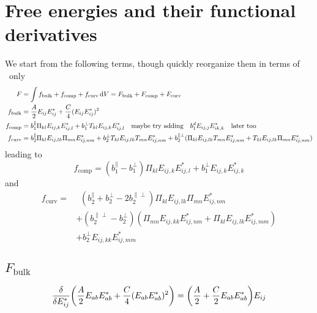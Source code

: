 \documentclass[11pt]{article}
\begin{document}
\newpage
\section{Free energies and their functional derivatives}\label{sec:freeenergies}
We start from the following terms, though quickly reorganize them in terms of \PP\ only
\begin{align}
    F &= \int f_\text{bulk} + f_\text{comp} + f_\text{curv} \dd{V} = F_\text{bulk} + F_\text{comp} + F_\text{curv}\\
    f_\text{bulk} &= \frac{A}{2} E_{ij}E_{ij}^* + \frac{C}{4} (E_{ij}E_{ij}^*)^2 \\
    f_\text{comp} &= b_1^\parallel \Pi_{kl} E_{ij,k}E_{ij,l}^* + b_1^\perp T_{kl} E_{ij,k}E_{ij,l}^* \qq{maybe try adding} b_1^d E_{ij,j}E_{ik,k}^* \qq{later too} \label{eq:fcompdef} \\
    f_\text{curv} &= b_2^\parallel \Pi_{kl}E_{ij,lk}\Pi_{mn}E_{ij,nm}^* + b_2^\perp T_{kl}E_{ij,lk}T_{mn}E_{ij,nm}^* + b_2^{\parallel\perp}(\Pi_{kl}E_{ij,lk}T_{mn}E_{ij,nm}^* + T_{kl}E_{ij,lk}\Pi_{mn}E_{ij,nm}^*)
\end{align}
leading to
\begin{equation}
    f_\text{comp} = (b_1^\parallel - b_1^\perp) \Pi_{kl} E_{ij,k}E_{ij,l}^* + b_1^\perp E_{ij,k}E_{ij,k}^*
\end{equation}
and
\begin{align}
    f_\text{curv} =&\enspace (b_2^\parallel + b_2^\perp - 2b_2^{\parallel\perp}) \Pi_{kl}E_{ij,lk}\Pi_{mn}E_{ij,nm}^* \\
    &+ (b_2^{\parallel\perp} - b_2^\perp)(\Pi_{mn}E_{ij,kk}E_{ij,nm}^* + \Pi_{kl}E_{ij,lk}E_{ij,mm}^*) \nonumber \\ 
    &+ b_2^\perp E_{ij,kk}E_{ij,mm}^* \nonumber
\end{align}

\subsection{$F_\text{bulk}$}
\begin{equation}
    \fdv{E_{ij}^*} \qty(\frac{A}{2} E_{ab}E_{ab}^* + \frac{C}{4} (E_{ab}E_{ab}^*)^2) = \qty(\frac{A}{2} + \frac{C}{2}E_{ab}E_{ab}^*)E_{ij}
\end{equation}
\end{document}
